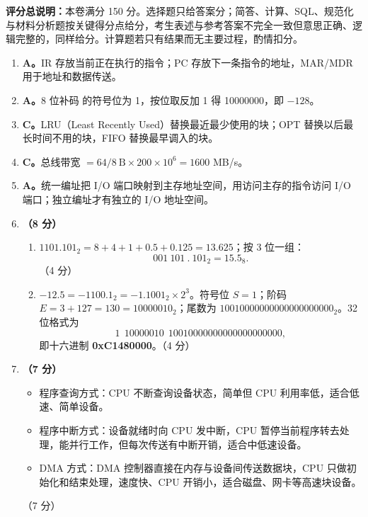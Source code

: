 \documentclass[a4paper,11pt]{article}
\begin{document}

\noindent\textbf{评分总说明：}本卷满分 150 分。选择题只给答案分；简答、计算、SQL、规范化与材料分析题按关键得分点给分，考生表述与参考答案不完全一致但意思正确、逻辑完整的，同样给分。计算题若只有结果而无主要过程，酌情扣分。


\begin{enumerate}[start=1, label=\textbf{\arabic*.}, leftmargin=2.4em, itemsep=0.45em]

\item \textbf{A。}IR 存放当前正在执行的指令；PC 存放下一条指令的地址，MAR/MDR 用于地址和数据传送。

\item \textbf{A。}8 位补码  的符号位为 1，按位取反加 1 得 10000000，即 $-128$。

\item \textbf{C。}LRU（Least Recently Used）替换最近最少使用的块；OPT 替换以后最长时间不用的块，FIFO 替换最早调入的块。

\item \textbf{C。}总线带宽 $=64/8\ \text{B}\times200\times10^{6}=1600$ MB/s。

\item \textbf{A。}统一编址把 I/O 端口映射到主存地址空间，用访问主存的指令访问 I/O 端口；独立编址才有独立的 I/O 地址空间。

\item \textbf{（8 分）}
\begin{enumerate}[label=（\arabic*）, leftmargin=2.2em, itemsep=1pt]
  \item $1101.101_2=8+4+1+0.5+0.125=13.625$；按 3 位一组：
  \[
  001\ 101\ .\ 101_2=15.5_8.
  \]
  \hfill（4 分）
  \item $-12.5=-1100.1_2=-1.1001_2\times2^{3}$。符号位 $S=1$；阶码 $E=3+127=130=10000010_2$；尾数为 $10010000000000000000000_2$。32 位格式为
  \[
  1\ \ 10000010\ \ 10010000000000000000000,
  \]
  即十六进制 \textbf{0xC1480000}。\hfill（4 分）
\end{enumerate}

\item \textbf{（7 分）}
\begin{itemize}[leftmargin=1.8em, itemsep=1pt]
  \item 程序查询方式：CPU 不断查询设备状态，简单但 CPU 利用率低，适合低速、简单设备。
  \item 程序中断方式：设备就绪时向 CPU 发中断，CPU 暂停当前程序转去处理，能并行工作，但每次传送有中断开销，适合中低速设备。
  \item DMA 方式：DMA 控制器直接在内存与设备间传送数据块，CPU 只做初始化和结束处理，速度快、CPU 开销小，适合磁盘、网卡等高速块设备。
\end{itemize}
\hfill（7 分）

\end{enumerate}
\end{document}
